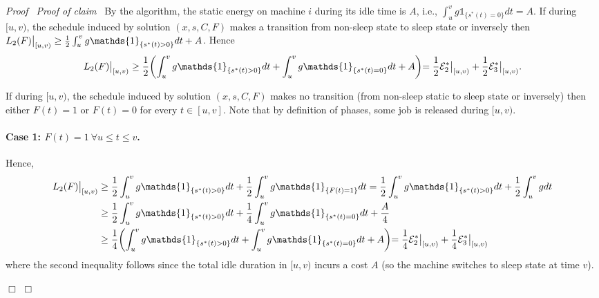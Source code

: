 \documentclass[11pt]{article}
\newenvironment{proof}{\noindent\emph{Proof\ }}{\hspace*{\fill}$\Box$\medskip}
\newenvironment{claimproof}{\noindent\emph{Proof of claim\ }}{\hspace*{\fill}$\Box$\medskip}
\newcommand\restr[2]{{\left.\kern-\nulldelimiterspace #1 \vphantom{\big|} \right|_{#2} }}
\newcommand{\one}{\ensuremath{\mathds{1}}}
\begin{document}
\begin{proof}
\begin{claimproof}
By the algorithm, the static energy on machine $i$ during 
its idle time is $A$, i.e., $\int_{u}^{v}  g\one_{\{s^{*}(t) = 0\}} dt = A$. 
If during $[u,v)$, the schedule induced by solution $(x,s,C,F)$ makes a transition from
non-sleep state to sleep state or inversely then 
$\restr{L_{2}(F)}{[u,v)} \geq \frac{1}{2} \int_{u}^{v} g \one_{\{s^{*}(t) > 0\}} dt + A$. Hence
$$
\restr{L_{2}(F)}{[u,v)} \geq \frac{1}{2} \biggl( \int_{u}^{v} g \one_{\{s^{*}(t) > 0\}} dt 
	      	+  \int_{u}^{v}  g \one_{\{s^{*}(t) = 0\}}dt + A \biggl) 
		= \frac{1}{2}\restr{\mathcal{E}^{*}_{2}}{[u,v)} + \frac{1}{2}\restr{\mathcal{E}^{*}_{3}}{[u,v)}.
$$


If during $[u,v)$, the schedule induced by solution $(x,s,C,F)$ makes no transition (from
non-sleep static to sleep state or inversely) then either $F(t) = 1$ or $F(t) = 0$ for every 
$t \in [u,v]$. Note that by definition of phases, some job is released during $[u,v)$.

\paragraph{Case 1: $F(t) = 1 ~\forall u \leq t \leq v$.} 
Hence,
\begin{align*}
\restr{L_{2}(F)}{[u,v)} &\geq \frac{1}{2} \int_{u}^{v} g \one_{\{s^{*}(t) > 0\}} dt 
		+ \frac{1}{2} \int_{u}^{v} g \one_{\{F(t) =1\}} dt 
		=  \frac{1}{2} \int_{u}^{v} g \one_{\{s^{*}(t) > 0\}} dt 
		+ \frac{1}{2} \int_{u}^{v} g dt \\
& \geq \frac{1}{2} \int_{u}^{v} g \one_{\{s^{*}(t) > 0\}} dt 
	      	+ \frac{1}{4} \int_{u}^{v}  g \one_{\{s^{*}(t) = 0\}}dt + \frac{A}{4} \\
& \geq \frac{1}{4} \biggl( \int_{u}^{v} g \one_{\{s^{*}(t) > 0\}} dt 
	      	+  \int_{u}^{v}  g \one_{\{s^{*}(t) = 0\}}dt + A \biggl) 
		= \frac{1}{4}\restr{\mathcal{E}^{*}_{2}}{[u,v)} + \frac{1}{4}\restr{\mathcal{E}^{*}_{3}}{[u,v)}
\end{align*}
where the second inequality follows since the total idle duration in $[u,v)$ incurs a cost $A$
(so the machine switches to sleep state at time $v$).


\end{claimproof}
\end{proof}
\end{document}
